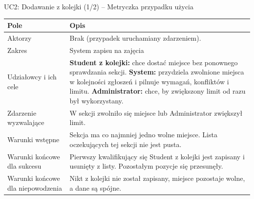 \documentclass[aspectratio=169, 10pt, xcolor=table]{beamer}
\renewcommand{\arraystretch}{1.18}
\begin{document}
\begin{frame}{UC2: Dodawanie z kolejki (1/2) -- Metryczka przypadku użycia}
    \scriptsize
    \renewcommand{\arraystretch}{1.18}
    \begin{tabularx}{\textwidth}{|U{3.6cm}|Y|}
        \hline
        \textcolor{NavyPrimary}{\textbf{Pole}} & \textcolor{NavyPrimary}{\textbf{Opis}} \\
        \hline
        Aktorzy & Brak (przypadek uruchamiany zdarzeniem). \\
        \hline
        Zakres & System zapisu na zajęcia \\
        \hline
        Udziałowcy i ich cele & \textbf{Student z kolejki:} chce dostać miejsce bez ponownego sprawdzania sekcji. \textbf{System:} przydziela zwolnione miejsca w kolejności zgłoszeń i pilnuje wymagań, konfliktów i limitu. \textbf{Administrator:} chce, by zwiększony limit od razu był wykorzystany. \\
        \hline
        Zdarzenie wyzwalające & W sekcji zwolniło się miejsce lub Administrator zwiększył limit. \\
        \hline
        Warunki wstępne & Sekcja ma co najmniej jedno wolne miejsce. Lista oczekujących tej sekcji nie jest pusta. \\
        \hline
        Warunki końcowe dla sukcesu & Pierwszy kwalifikujący się Student z kolejki jest zapisany i usunięty z listy. Pozostałym pozycje się przesunęły. \\
        \hline
        Warunki końcowe dla niepowodzenia & Nikt z kolejki nie został zapisany, miejsce pozostaje wolne, a dane są spójne. \\
        \hline
    \end{tabularx}
\end{frame}
\end{document}

